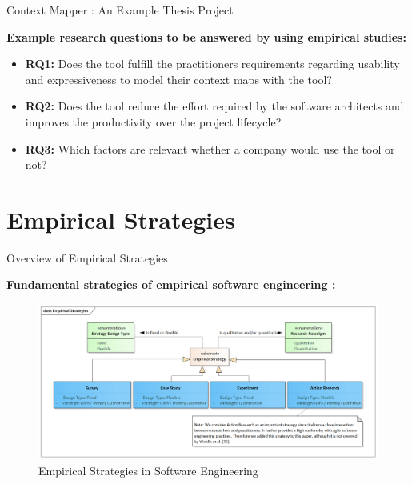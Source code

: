 \documentclass[10pt]{beamer}
\begin{document}
\begin{frame}{Context Mapper \cite{contextmapper}: An Example Thesis Project}
	
	\textbf{Example research questions to be answered by using empirical studies:}
	
	\bigskip
	\begin{itemize}
		\item \textbf{RQ1:} Does the tool fulfill the practitioners requirements regarding usability and expressiveness to model their context maps with the tool?
		\item \textbf{RQ2:} Does the tool reduce the effort required by the software architects and improves the productivity over the project lifecycle?
		\item \textbf{RQ3:} Which factors are relevant whether a company would use the tool or not?
	\end{itemize}
	
\end{frame}

\section{Empirical Strategies}

\begin{frame}{Overview of Empirical Strategies}
	
	\textbf{Fundamental strategies of empirical software engineering \cite{Avison:1999:AR:291469.291479,Wohlin:2012:ESE:2349018}:}
	
	\begin{figure}[H]
		\centering
		\includegraphics[width=1.0\textwidth]{Empirical_Strategies}
		\caption{Empirical Strategies in Software Engineering}
		\label{fig:empirical-strategies}
	\end{figure} 
	
\end{frame}
\end{document}
